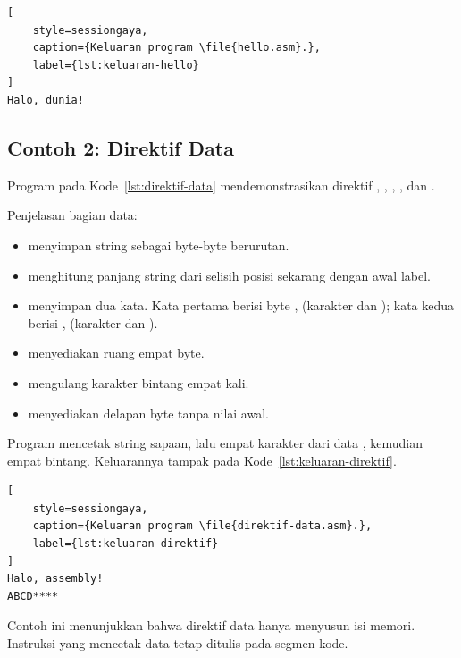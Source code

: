 \begin{lstlisting}[
    style=sessiongaya,
    caption={Keluaran program \file{hello.asm}.},
    label={lst:keluaran-hello}
]
Halo, dunia!
\end{lstlisting}

\subsection{Contoh 2: Direktif Data}

Program pada Kode~\ref{lst:direktif-data} mendemonstrasikan direktif
, , , , dan .



Penjelasan bagian data:

\begin{itemize}
    \item {}
          menyimpan string sebagai byte-byte berurutan.
    \item {} menghitung panjang string
          dari selisih posisi sekarang dengan awal label.
    \item {} menyimpan dua kata. Kata
          pertama berisi byte ,  (karakter
           dan ); kata kedua berisi ,
           (karakter  dan ).
    \item {} menyediakan ruang empat byte.
    \item {} mengulang karakter bintang
          empat kali.
    \item {} menyediakan delapan byte tanpa
          nilai awal.
\end{itemize}

Program mencetak string sapaan, lalu empat karakter dari data
, kemudian empat bintang. Keluarannya tampak pada
Kode~\ref{lst:keluaran-direktif}.

\begin{lstlisting}[
    style=sessiongaya,
    caption={Keluaran program \file{direktif-data.asm}.},
    label={lst:keluaran-direktif}
]
Halo, assembly!
ABCD****
\end{lstlisting}

Contoh ini menunjukkan bahwa direktif data hanya menyusun isi
memori. Instruksi yang mencetak data tetap ditulis pada segmen kode.
